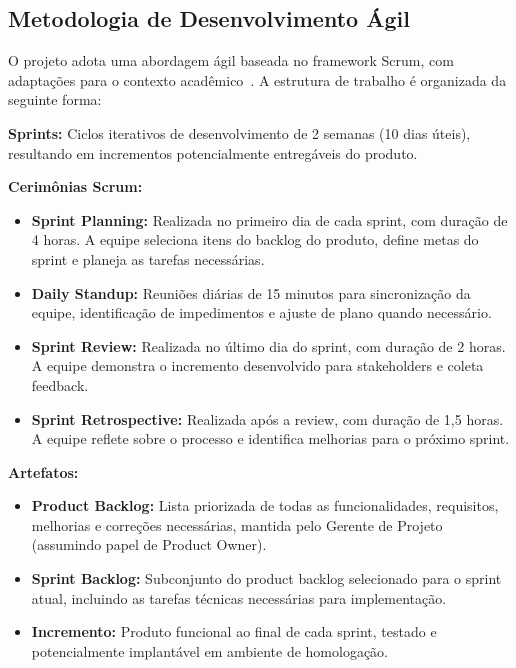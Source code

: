 \subsection{Metodologia de Desenvolvimento Ágil}

O projeto adota uma abordagem ágil baseada no framework Scrum, com adaptações para o contexto acadêmico~\cite{Schwaber:2020}. A estrutura de trabalho é organizada da seguinte forma:

\textbf{Sprints:} Ciclos iterativos de desenvolvimento de 2 semanas (10 dias úteis), resultando em incrementos potencialmente entregáveis do produto.

\textbf{Cerimônias Scrum:}
\begin{itemize}
    \item \textbf{Sprint Planning:} Realizada no primeiro dia de cada sprint, com duração de 4 horas. A equipe seleciona itens do backlog do produto, define metas do sprint e planeja as tarefas necessárias.

    \item \textbf{Daily Standup:} Reuniões diárias de 15 minutos para sincronização da equipe, identificação de impedimentos e ajuste de plano quando necessário.

    \item \textbf{Sprint Review:} Realizada no último dia do sprint, com duração de 2 horas. A equipe demonstra o incremento desenvolvido para stakeholders e coleta feedback.

    \item \textbf{Sprint Retrospective:} Realizada após a review, com duração de 1,5 horas. A equipe reflete sobre o processo e identifica melhorias para o próximo sprint.
\end{itemize}

\textbf{Artefatos:}
\begin{itemize}
    \item \textbf{Product Backlog:} Lista priorizada de todas as funcionalidades, requisitos, melhorias e correções necessárias, mantida pelo Gerente de Projeto (assumindo papel de Product Owner).

    \item \textbf{Sprint Backlog:} Subconjunto do product backlog selecionado para o sprint atual, incluindo as tarefas técnicas necessárias para implementação.

    \item \textbf{Incremento:} Produto funcional ao final de cada sprint, testado e potencialmente implantável em ambiente de homologação.
\end{itemize}

